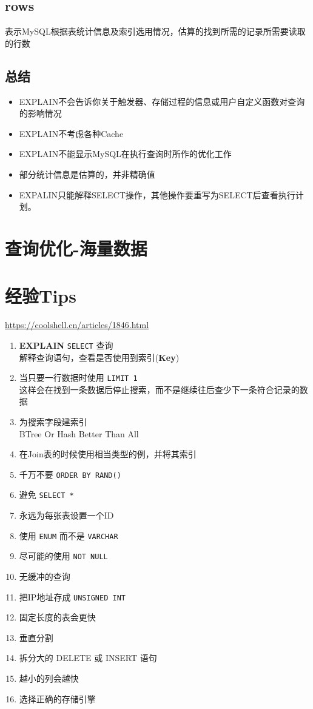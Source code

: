 \documentclass[UTF8,a4paper,12pt]{ctexbook}
\begin{document}
		\subsection{rows}
			表示MySQL根据表统计信息及索引选用情况，估算的找到所需的记录所需要读取的行数
	
		\subsection{总结}
			\begin{itemize}
				\item EXPLAIN不会告诉你关于触发器、存储过程的信息或用户自定义函数对查询的影响情况
				\item EXPLAIN不考虑各种Cache
				\item EXPLAIN不能显示MySQL在执行查询时所作的优化工作
				\item 部分统计信息是估算的，并非精确值
				\item EXPALIN只能解释SELECT操作，其他操作要重写为SELECT后查看执行计划。
			\end{itemize}
			

	\section{查询优化-海量数据}
	
	\section{经验Tips}
		\url{https://coolshell.cn/articles/1846.html}
		
		\begin{enumerate}
			\item \textbf{EXPLAIN} \verb|SELECT| 查询 \\ 解释查询语句，查看是否使用到索引(\textbf{Key})
			\item 当只要一行数据时使用 \verb|LIMIT 1|  \\ 这样会在找到一条数据后停止搜索，而不是继续往后查少下一条符合记录的数据
			\item 为搜索字段建索引 \\ BTree Or Hash Better Than All
			\item 在Join表的时候使用相当类型的例，并将其索引
			\item 千万不要 \verb|ORDER BY RAND()|
			\item 避免 \verb|SELECT *|
			\item 永远为每张表设置一个ID
			\item 使用 \verb|ENUM| 而不是 \verb|VARCHAR|
			\item 尽可能的使用 \verb|NOT NULL|
			\item 无缓冲的查询
			\item 把IP地址存成 \verb|UNSIGNED INT|
			\item 固定长度的表会更快
			\item 垂直分割
			\item 拆分大的 DELETE 或 INSERT 语句
			\item 越小的列会越快
			\item 选择正确的存储引擎
		\end{enumerate}
\end{document}
